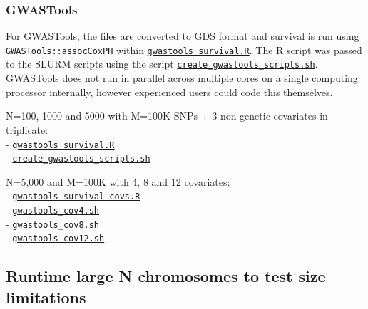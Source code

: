 \documentclass[]{DissertateUSU}
\begin{document}
\subsubsection{GWASTools}\label{gwastools}

For GWASTools, the files are converted to GDS format and survival is run
using \texttt{GWASTools::assocCoxPH} within
\href{https://github.com/suchestoncampbelllab/gwasurvivr_manuscript/blob/master/benchmark_experiments/code/gwastools_survival.R}{\texttt{gwastools\_survival.R}}.
The R script was passed to the SLURM scripts using the script
\href{https://github.com/suchestoncampbelllab/gwasurvivr_manuscript/blob/master/benchmark_experiments/code/create_gwastools_scripts.sh}{\texttt{create\_gwastools\_scripts.sh}}.
GWASTools does not run in parallel across multiple cores on a single
computing processor internally, however experienced users could code
this themselves.

N=100, 1000 and 5000 with M=100K SNPs + 3 non-genetic covariates in
triplicate:\\
-
\href{https://github.com/suchestoncampbelllab/gwasurvivr_manuscript/blob/master/benchmark_experiments/code/gwastools_survival.R}{\texttt{gwastools\_survival.R}}\\
-
\href{https://github.com/suchestoncampbelllab/gwasurvivr_manuscript/blob/master/benchmark_experiments/code/create_gwastools_scripts.sh}{\texttt{create\_gwastools\_scripts.sh}}

N=5,000 and M=100K with 4, 8 and 12 covariates:\\
-
\href{https://github.com/suchestoncampbelllab/gwasurvivr_manuscript/blob/master/diff_cov_benchmarks/code/gwastools_survival_covs.R}{\texttt{gwastools\_survival\_covs.R}}\\
-
\href{https://github.com/suchestoncampbelllab/gwasurvivr_manuscript/blob/master/diff_cov_benchmarks/code/gwastools_cov4.sh}{\texttt{gwastools\_cov4.sh}}\\
-
\href{https://github.com/suchestoncampbelllab/gwasurvivr_manuscript/blob/master/diff_cov_benchmarks/code/gwastools_cov8.sh}{\texttt{gwastools\_cov8.sh}}\\
-
\href{https://github.com/suchestoncampbelllab/gwasurvivr_manuscript/blob/master/diff_cov_benchmarks/code/gwastools_cov12.sh}{\texttt{gwastools\_cov12.sh}}

\subsection{Runtime large N chromosomes to test size
limitations}\label{runtime-large-n-chromosomes-to-test-size-limitations}
\end{document}
